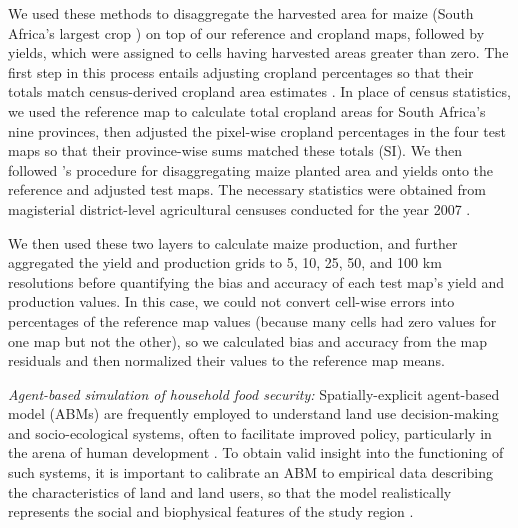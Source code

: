 \documentclass[a4paper]{article}
\newcommand{\citetapos}[1]{\citeauthor{#1}'s \citeyearpar{#1}}
\begin{document}
We used these methods to disaggregate the harvested area for maize (South Africa's largest crop \citep{estes_projected_2013}) on top of our reference and cropland maps, followed by yields, which were assigned to cells having harvested areas greater than zero. The first step in this process entails adjusting cropland percentages so that their totals match census-derived cropland area estimates \citep{ramankutty_farming_2008}. In place of census statistics, we used the reference map to calculate total cropland areas for South Africa's nine provinces, then adjusted the pixel-wise cropland percentages in the four test maps so that their province-wise sums matched these totals (SI). We then followed \citetapos{monfreda_farming_2008} procedure for disaggregating maize \citep[South Africa's largest crop;][]{estes_comparing_2013} planted area and yields onto the reference and adjusted test maps. The necessary statistics were obtained from magisterial district-level agricultural censuses conducted for the year 2007 \citep{statistics_south_africa_commercial_2007}. 

We then used these two layers to calculate maize production, and further aggregated the yield and production grids to 5, 10, 25, 50, and 100 km resolutions before quantifying the bias and accuracy of each test map's yield and production values. In this case, we could not convert cell-wise errors into percentages of the reference map values (because many cells had zero values for one map but not the other), so we calculated bias and accuracy from the map residuals and then normalized their values to the reference map means. 


\vspace{4 pt}
\noindent\emph{Agent-based simulation of household food security: }
Spatially-explicit agent-based model (ABMs) are frequently employed to understand land use decision-making and socio-ecological systems, often to facilitate improved policy, particularly in the arena of human development \citep{berger_creating_2006}. To obtain valid insight into the functioning of such systems, it is important to calibrate an ABM to empirical data describing the characteristics of land and land users, so that the model realistically represents the social and biophysical features of the study region \citep{berger_creating_2006}. 
\end{document}
